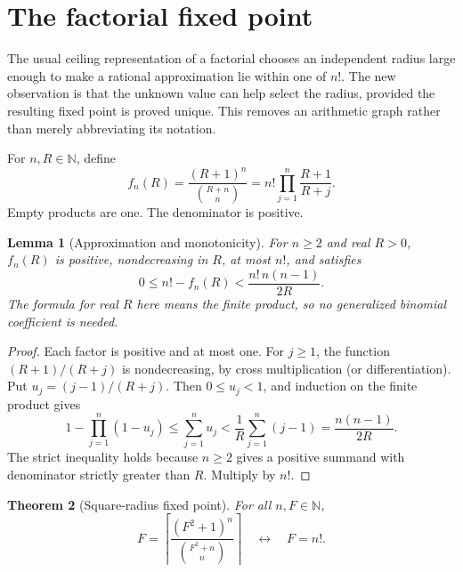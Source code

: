 \documentclass[11pt,letterpaper]{article}
\newtheorem{theorem}{Theorem}[section]
\newtheorem{lemma}[theorem]{Lemma}
\theoremstyle{definition}
\theoremstyle{remark}
\newcommand{\N}{\mathbb N}
\newcommand{\ceil}[1]{\left\lceil#1\right\rceil}
\begin{document}
\section{The factorial fixed point}
\label{sec:factorial}

The usual ceiling representation of a factorial chooses an independent
radius large enough to make a rational approximation lie within one of
$n!$. The new observation is that the unknown value can help select the
radius, provided the resulting fixed point is proved unique. This removes
an arithmetic graph rather than merely abbreviating its notation.

For $n,R\in\N$, define
\[
 f_n(R)=\frac{(R+1)^n}{\binom{R+n}{n}}
       =n!\prod_{j=1}^{n}\frac{R+1}{R+j}.
\]
Empty products are one. The denominator is positive.

\begin{lemma}[Approximation and monotonicity]\label{lem:defect}
For $n\ge2$ and real $R>0$, $f_n(R)$ is positive, nondecreasing in $R$,
at most $n!$, and satisfies
\begin{equation}\label{eq:defect}
           0\le n!-f_n(R)<\frac{n!\,n(n-1)}{2R}.
\end{equation}
The formula for real $R$ here means the finite product, so no generalized
binomial coefficient is needed.
\end{lemma}

\begin{proof}
Each factor is positive and at most one. For $j\ge1$, the function
$(R+1)/(R+j)$ is nondecreasing, by cross multiplication (or differentiation).
Put $u_j=(j-1)/(R+j)$. Then $0\le u_j<1$, and induction on the finite
product gives
\[
 1-\prod_{j=1}^n(1-u_j)\le\sum_{j=1}^n u_j
       <\frac1R\sum_{j=1}^n(j-1)=\frac{n(n-1)}{2R}.
\]
The strict inequality holds because $n\ge2$ gives a positive summand
with denominator strictly greater than $R$. Multiply by $n!$.
\end{proof}

\begin{theorem}[Square-radius fixed point]\label{thm:fixedpoint}
For all $n,F\in\N$,
\begin{equation}\label{eq:fixedpoint}
 F=\ceil{\frac{(F^2+1)^n}{\binom{F^2+n}{n}}}
                   \quad\longleftrightarrow\quad F=n!.
\end{equation}
\end{theorem}
\end{document}
